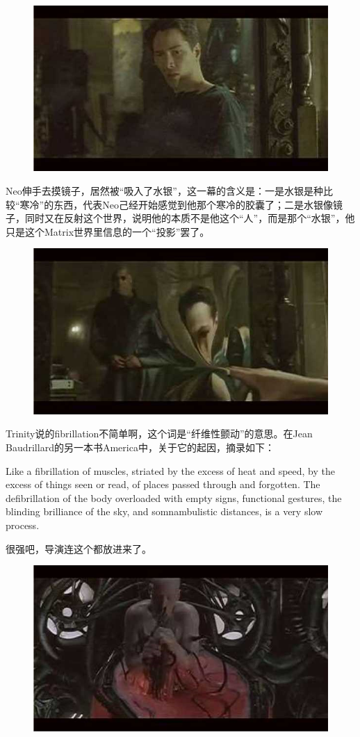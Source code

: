 \documentclass[UTF8]{ctexart}
\begin{document}
\begin{figure}[htb]
\centering
\includegraphics[width=0.5\linewidth]{fig/read_Matrix-20}
\end{figure}

Neo伸手去摸镜子，居然被“吸入了水银”，这一幕的含义是：一是水银是种比较“寒冷”的东西，代表Neo己经开始感觉到他那个寒冷的胶囊了；二是水银像镜子，同时又在反射这个世界，说明他的本质不是他这个“人”，而是那个“水银”，他只是这个Matrix世界里信息的一个“投影”罢了。

\begin{figure}[htb]
\centering
\includegraphics[width=0.5\linewidth]{fig/read_Matrix-21}
\end{figure}

Trinity说的fibrillation不简单啊，这个词是“纤维性颤动”的意思。在Jean Baudrillard的另一本书America中，关于它的起因，摘录如下：

Like a fibrillation of muscles, striated by the excess of heat and speed, by the excess of things seen or read, of places passed through and forgotten. The defibrillation of the body overloaded with empty signs, functional gestures, the blinding brilliance of the sky, and somnambulistic distances, is a very slow process.

很强吧，导演连这个都放进来了。

\begin{figure}[htb]
\centering
\includegraphics[width=0.5\linewidth]{fig/read_Matrix-22}
\end{figure}
\end{document}
